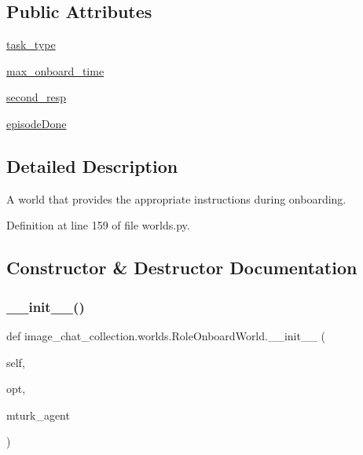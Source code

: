 \subsection*{Public Attributes}
\begin{DoxyCompactItemize}
\item 
\hyperlink{classimage__chat__collection_1_1worlds_1_1RoleOnboardWorld_ad9ed130b4de7849a205afa0d2e0881ab}{task\+\_\+type}
\item 
\hyperlink{classimage__chat__collection_1_1worlds_1_1RoleOnboardWorld_a01964521ee7db1f4fab890a88f0d1940}{max\+\_\+onboard\+\_\+time}
\item 
\hyperlink{classimage__chat__collection_1_1worlds_1_1RoleOnboardWorld_aae14ab21837d108894456e35c150f1fa}{second\+\_\+resp}
\item 
\hyperlink{classimage__chat__collection_1_1worlds_1_1RoleOnboardWorld_a5f75149b8c759e83c23b1e39ed2d5dbb}{episode\+Done}
\end{DoxyCompactItemize}


\subsection{Detailed Description}
\begin{DoxyVerb}A world that provides the appropriate instructions during onboarding.
\end{DoxyVerb}
 

Definition at line 159 of file worlds.\+py.



\subsection{Constructor \& Destructor Documentation}
\mbox{\label{classimage__chat__collection_1_1worlds_1_1RoleOnboardWorld_abc1062c3b8465f56b06b8173925d117d}} 
\subsubsection{\texorpdfstring{\+\_\+\+\_\+init\+\_\+\+\_\+()}{\_\_init\_\_()}}
{\footnotesize\ttfamily def image\+\_\+chat\+\_\+collection.\+worlds.\+Role\+Onboard\+World.\+\_\+\+\_\+init\+\_\+\+\_\+ (\begin{DoxyParamCaption}\item[{}]{self,  }\item[{}]{opt,  }\item[{}]{mturk\+\_\+agent }\end{DoxyParamCaption})}



